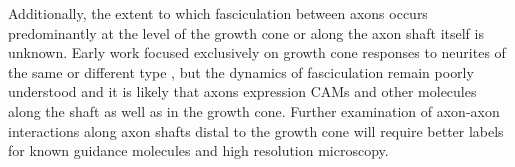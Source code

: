 Additionally, the extent to which fasciculation between axons occurs predominantly at the level of the growth cone or along the axon shaft itself is unknown.
Early work focused exclusively on growth cone responses to neurites of the same or different type \cite{nakajima1965selectivity}, but the dynamics of fasciculation remain poorly understood and it is likely that axons expression CAMs and other molecules along the shaft as well as in the growth cone. %
Further examination of axon-axon interactions along axon shafts distal to the growth cone will require better labels for known guidance molecules and high resolution microscopy.
